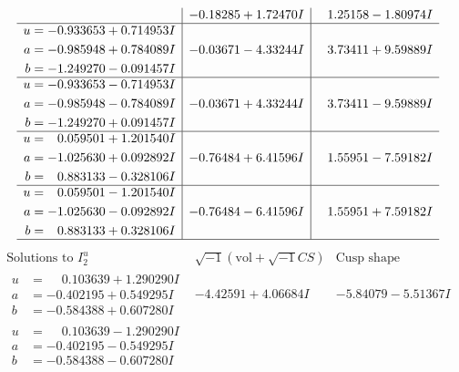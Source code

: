 \documentclass[1p]{elsarticle_modified}
\theoremstyle{definition}
\newcommand{\I}{\sqrt{-1}}
\begin{document}
$$\begin{array}{c|c|c}
 & -0.18285 + 1.72470 I & \phantom{-}1.25158 - 1.80974 I \\ \hline\begin{aligned}
u &= -0.933653 + 0.714953 I \\
a &= -0.985948 + 0.784089 I \\
b &= -1.249270 - 0.091457 I\end{aligned}
 & -0.03671 - 4.33244 I & \phantom{-}3.73411 + 9.59889 I \\ \hline\begin{aligned}
u &= -0.933653 - 0.714953 I \\
a &= -0.985948 - 0.784089 I \\
b &= -1.249270 + 0.091457 I\end{aligned}
 & -0.03671 + 4.33244 I & \phantom{-}3.73411 - 9.59889 I \\ \hline\begin{aligned}
u &= \phantom{-}0.059501 + 1.201540 I \\
a &= -1.025630 + 0.092892 I \\
b &= \phantom{-}0.883133 - 0.328106 I\end{aligned}
 & -0.76484 + 6.41596 I & \phantom{-}1.55951 - 7.59182 I \\ \hline\begin{aligned}
u &= \phantom{-}0.059501 - 1.201540 I \\
a &= -1.025630 - 0.092892 I \\
b &= \phantom{-}0.883133 + 0.328106 I\end{aligned}
 & -0.76484 - 6.41596 I & \phantom{-}1.55951 + 7.59182 I\\
 \hline 
 \end{array}$$\newpage$$\begin{array}{c|c|c}  
\text{Solutions to }I^u_{2}& \I (\text{vol} + \sqrt{-1}CS) & \text{Cusp shape}\\
 \hline 
\begin{aligned}
u &= \phantom{-}0.103639 + 1.290290 I \\
a &= -0.402195 + 0.549295 I \\
b &= -0.584388 + 0.607280 I\end{aligned}
 & -4.42591 + 4.06684 I & -5.84079 - 5.51367 I \\ \hline\begin{aligned}
u &= \phantom{-}0.103639 - 1.290290 I \\
a &= -0.402195 - 0.549295 I \\
b &= -0.584388 - 0.607280 I\end{aligned}

\end{array}$$
\end{document}
